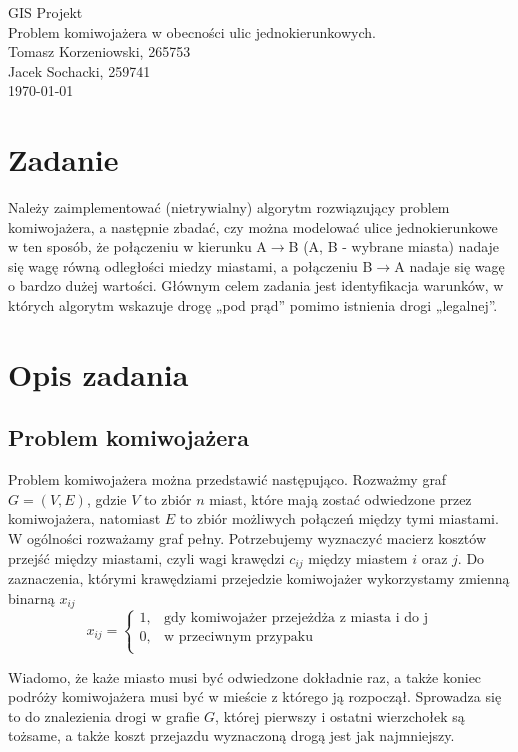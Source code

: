 \documentclass[11pt,a4paper,twoside]{article}
\begin{document}
\begin{center}
\vspace*{3\baselineskip}
{\LARGE{GIS Projekt}}
\\
\vspace*{1\baselineskip}
{\large{Problem komiwojażera w obecności ulic jednokierunkowych.}}
\\
\vspace*{1\baselineskip}
Tomasz Korzeniowski, 265753\\
Jacek Sochacki, 259741
\\
\vspace*{1\baselineskip}
\today
\end{center}
\section{Zadanie}
Należy zaimplementować (nietrywialny) algorytm rozwiązujący problem komiwojażera, a następnie zbadać, czy można modelować ulice jednokierunkowe w ten sposób, że połączeniu w kierunku A$\rightarrow$B (A, B - wybrane miasta) nadaje się wagę równą odległości miedzy miastami, a połączeniu B$\rightarrow$A nadaje się wagę o bardzo dużej wartości. Głównym celem zadania jest identyfikacja warunków, w których algorytm wskazuje drogę „pod prąd” pomimo istnienia drogi „legalnej”.
\section{Opis zadania}
\subsection{Problem komiwojażera}
Problem komiwojażera można przedstawić następująco. Rozważmy graf $G=(V, E)$, gdzie $V$ to zbiór $n$ miast, które mają zostać odwiedzone przez komiwojażera, natomiast $E$ to zbiór możliwych połączeń między tymi miastami. W ogólności rozważamy graf pełny. Potrzebujemy wyznaczyć macierz kosztów przejść między miastami, czyli wagi krawędzi $c_{ij}$ między miastem $i$ oraz $j$. Do zaznaczenia, którymi krawędziami przejedzie komiwojażer wykorzystamy zmienną binarną $x_{ij}$
$$x_{ij} = 
	\begin{cases} 
      1, & \text{gdy komiwojażer przejeżdża z miasta i do j} \\
      0, & \text{w przeciwnym przypaku}\\
   \end{cases}
$$

Wiadomo, że każe miasto musi być odwiedzone dokładnie raz, a także koniec podróży komiwojażera musi być w mieście z którego ją rozpoczął. Sprowadza się to do znalezienia drogi w grafie $G$, której pierwszy i ostatni wierzchołek są tożsame, a także koszt przejazdu wyznaczoną drogą jest jak najmniejszy. 
\end{document}
